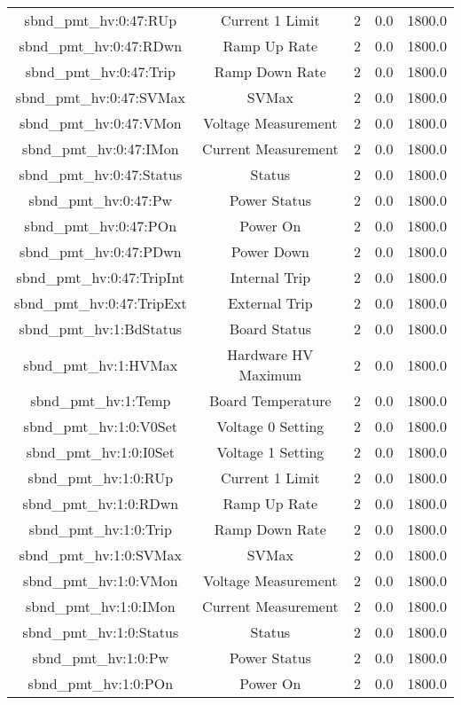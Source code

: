 \begin{center}
\begin{longtable}{c | c c c c }
sbnd\_pmt\_hv:0:47:RUp & Current 1 Limit & 2 & 0.0 & 1800.0\\ 
sbnd\_pmt\_hv:0:47:RDwn & Ramp Up Rate & 2 & 0.0 & 1800.0\\ 
sbnd\_pmt\_hv:0:47:Trip & Ramp Down Rate & 2 & 0.0 & 1800.0\\ 
sbnd\_pmt\_hv:0:47:SVMax & SVMax & 2 & 0.0 & 1800.0\\ 
sbnd\_pmt\_hv:0:47:VMon & Voltage Measurement & 2 & 0.0 & 1800.0\\ 
sbnd\_pmt\_hv:0:47:IMon & Current Measurement & 2 & 0.0 & 1800.0\\ 
sbnd\_pmt\_hv:0:47:Status & Status & 2 & 0.0 & 1800.0\\ 
sbnd\_pmt\_hv:0:47:Pw & Power Status & 2 & 0.0 & 1800.0\\ 
sbnd\_pmt\_hv:0:47:POn & Power On & 2 & 0.0 & 1800.0\\ 
sbnd\_pmt\_hv:0:47:PDwn & Power Down & 2 & 0.0 & 1800.0\\ 
sbnd\_pmt\_hv:0:47:TripInt & Internal Trip & 2 & 0.0 & 1800.0\\ 
sbnd\_pmt\_hv:0:47:TripExt & External Trip & 2 & 0.0 & 1800.0\\ 
sbnd\_pmt\_hv:1:BdStatus & Board Status & 2 & 0.0 & 1800.0\\ 
sbnd\_pmt\_hv:1:HVMax & Hardware HV Maximum & 2 & 0.0 & 1800.0\\ 
sbnd\_pmt\_hv:1:Temp & Board Temperature & 2 & 0.0 & 1800.0\\ 
sbnd\_pmt\_hv:1:0:V0Set & Voltage 0 Setting & 2 & 0.0 & 1800.0\\ 
sbnd\_pmt\_hv:1:0:I0Set & Voltage 1 Setting & 2 & 0.0 & 1800.0\\ 
sbnd\_pmt\_hv:1:0:RUp & Current 1 Limit & 2 & 0.0 & 1800.0\\ 
sbnd\_pmt\_hv:1:0:RDwn & Ramp Up Rate & 2 & 0.0 & 1800.0\\ 
sbnd\_pmt\_hv:1:0:Trip & Ramp Down Rate & 2 & 0.0 & 1800.0\\ 
sbnd\_pmt\_hv:1:0:SVMax & SVMax & 2 & 0.0 & 1800.0\\ 
sbnd\_pmt\_hv:1:0:VMon & Voltage Measurement & 2 & 0.0 & 1800.0\\ 
sbnd\_pmt\_hv:1:0:IMon & Current Measurement & 2 & 0.0 & 1800.0\\ 
sbnd\_pmt\_hv:1:0:Status & Status & 2 & 0.0 & 1800.0\\ 
sbnd\_pmt\_hv:1:0:Pw & Power Status & 2 & 0.0 & 1800.0\\ 
sbnd\_pmt\_hv:1:0:POn & Power On & 2 & 0.0 & 1800.0\\ 

\end{longtable}
\end{center}
